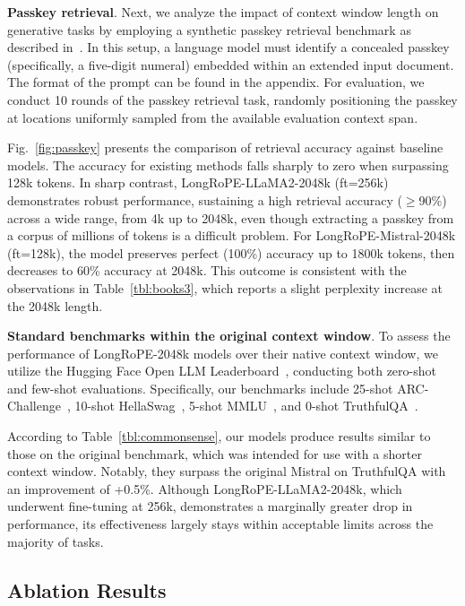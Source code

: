 \textbf{Passkey retrieval}. Next, we analyze the impact of context window length on generative tasks by employing a synthetic passkey retrieval benchmark as described in~\cite{passkey}. In this setup, a language model must identify a concealed passkey (specifically, a five-digit numeral) embedded within an extended input document. The format of the prompt can be found in the appendix. For evaluation, we conduct 10 rounds of the passkey retrieval task, randomly positioning the passkey at locations uniformly sampled from the available evaluation context span.

Fig.~\ref{fig:passkey} presents the comparison of retrieval accuracy against baseline models. The accuracy for existing methods falls sharply to zero when surpassing 128k tokens. In sharp contrast, LongRoPE-LLaMA2-2048k (ft=256k) demonstrates robust performance, sustaining a high retrieval accuracy ($\ge$90\%) across a wide range, from 4k up to 2048k, even though extracting a passkey from a corpus of millions of tokens is a difficult problem. For LongRoPE-Mistral-2048k (ft=128k), the model preserves perfect (100\%) accuracy up to 1800k tokens, then decreases to 60\% accuracy at 2048k. This outcome is consistent with the observations in Table~\ref{tbl:books3}, which reports a slight perplexity increase at the 2048k length.

\textbf{Standard benchmarks within the original context window}. To assess the performance of LongRoPE-2048k models over their native context window, we utilize the Hugging Face Open LLM Leaderboard~\cite{huggingfaceboard}, conducting both zero-shot and few-shot evaluations. Specifically, our benchmarks include 25-shot ARC-Challenge~\cite{allenai:arc}, 10-shot HellaSwag~\cite{zellers2019hellaswag}, 5-shot MMLU~\cite{mmlu}, and 0-shot TruthfulQA~\cite{lin2021truthfulqa}.

According to Table~\ref{tbl:commonsense}, our models produce results similar to those on the original benchmark, which was intended for use with a shorter context window. Notably, they surpass the original Mistral on TruthfulQA with an improvement of +0.5\%. Although LongRoPE-LLaMA2-2048k, which underwent fine-tuning at 256k, demonstrates a marginally greater drop in performance, its effectiveness largely stays within acceptable limits across the majority of tasks.

\subsection{Ablation Results}

